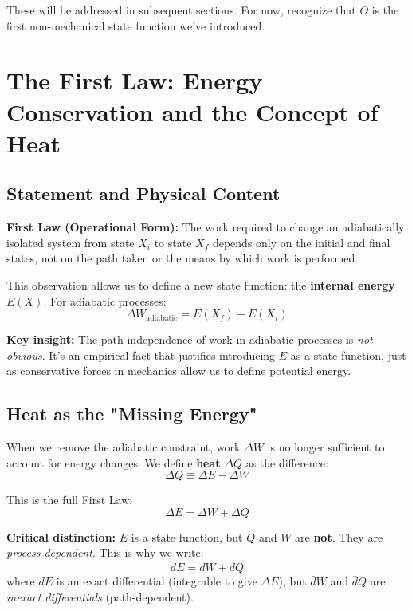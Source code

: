 \documentclass[9pt,twocoloumn]{article}
\begin{document}
These will be addressed in subsequent sections. For now, recognize that $\Theta$ is the first non-mechanical state function we've introduced.
\section{The First Law: Energy Conservation and the Concept of Heat}

\subsection{Statement and Physical Content}
\textbf{First Law (Operational Form):} The work required to change an adiabatically isolated system from state $X_i$ to state $X_f$ depends only on the initial and final states, not on the path taken or the means by which work is performed.

This observation allows us to define a new state function: the \textbf{internal energy} $E(X)$. For adiabatic processes:
\begin{equation}
\Delta W_{\text{adiabatic}} = E(X_f) - E(X_i)
\end{equation}

\textbf{Key insight:} The path-independence of work in adiabatic processes is \emph{not obvious}. It's an empirical fact that justifies introducing $E$ as a state function, just as conservative forces in mechanics allow us to define potential energy.

\subsection{Heat as the "Missing Energy"}
When we remove the adiabatic constraint, work $\Delta W$ is no longer sufficient to account for energy changes. We define \textbf{heat} $\Delta Q$ as the difference:
\begin{equation}
\Delta Q \equiv \Delta E - \Delta W
\end{equation}

This is the full First Law:
\begin{equation}
\boxed{\Delta E = \Delta W + \Delta Q}
\end{equation}

\textbf{Critical distinction:} $E$ is a state function, but $Q$ and $W$ are \textbf{not}. They are \emph{process-dependent}. This is why we write:
\begin{equation}
dE = \bar{d}W + \bar{d}Q
\end{equation}
where $dE$ is an exact differential (integrable to give $\Delta E$), but $\bar{d}W$ and $\bar{d}Q$ are \emph{inexact differentials} (path-dependent).
\end{document}
